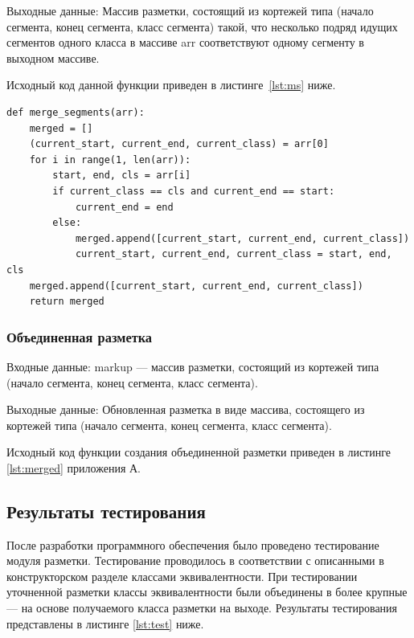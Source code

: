 Выходные данные: Массив разметки, состоящий из кортежей типа (начало сегмента, конец сегмента, класс сегмента) такой, что несколько подряд идущих сегментов одного класса в массиве arr соответствуют одному сегменту в выходном массиве.

Исходный код данной функции приведен в листинге~\ref{lst:ms} ниже.

\begin{lstlisting}[caption={Слияние смежных сегментов одного класса в один}, label={lst:ms}]
def merge_segments(arr):
    merged = []
    (current_start, current_end, current_class) = arr[0]
    for i in range(1, len(arr)):
        start, end, cls = arr[i]
        if current_class == cls and current_end == start:
            current_end = end
        else:
            merged.append([current_start, current_end, current_class])
            current_start, current_end, current_class = start, end, cls
    merged.append([current_start, current_end, current_class])
    return merged
\end{lstlisting}

\subsubsection{Объединенная разметка} %
Входные данные: markup --- массив разметки, состоящий из кортежей типа (начало сегмента, конец сегмента, класс сегмента).

Выходные данные: Обновленная разметка в виде массива, состоящего из кортежей типа (начало сегмента, конец сегмента, класс сегмента).

Исходный код функции создания объединенной разметки приведен в листинге \ref{lst:merged} приложения А.

\subsection{Результаты тестирования}

После разработки программного обеспечения было проведено тестирование модуля разметки.
Тестирование проводилось в соответствии с описанными в конструкторском разделе классами эквивалентности.
При тестировании уточненной разметки классы эквивалентности были объединены в более крупные --- на основе получаемого класса разметки на выходе.
Результаты тестирования представлены в листинге \ref{lst:test} ниже.

